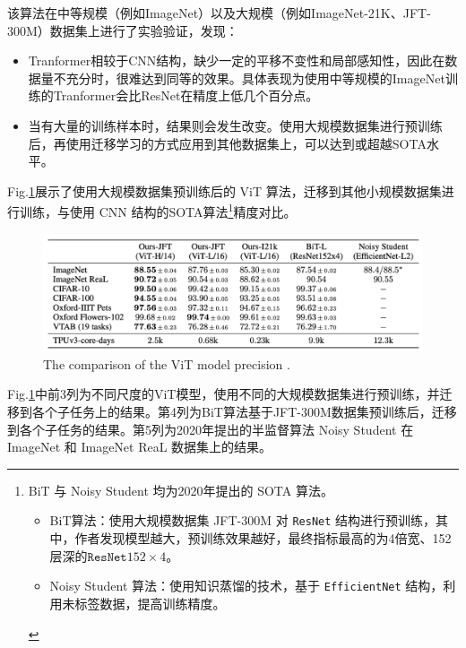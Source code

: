 \documentclass[letterpaper,10pt]{article}
\begin{document}
	
	该算法在中等规模（例如ImageNet）以及大规模（例如ImageNet-21K、JFT-300M）数据集上进行了实验验证，发现：
	
	\begin{itemize}
		\item {}
			Tranformer相较于CNN结构，缺少一定的平移不变性和局部感知性，因此在数据量不充分时，很难达到同等的效果。具体表现为使用中等规模的ImageNet训练的Tranformer会比ResNet在精度上低几个百分点。
		\item {}
			当有大量的训练样本时，结果则会发生改变。使用大规模数据集进行预训练后，再使用迁移学习的方式应用到其他数据集上，可以达到或超越SOTA水平。
	\end{itemize}
	
	Fig.\ref{fig: ViT precision}展示了使用大规模数据集预训练后的 ViT 算法，迁移到其他小规模数据集进行训练，与使用 CNN 结构的SOTA算法\footnote{BiT 与 Noisy Student 均为2020年提出的 SOTA 算法。
		\begin{itemize}
			\item {}
				BiT算法\cite{kolesnikov2020big}：使用大规模数据集 JFT-300M 对 \texttt{ResNet} 结构进行预训练，其中，作者发现模型越大，预训练效果越好，最终指标最高的为4倍宽、152层深的$\texttt{ResNet}152\times 4$。
			\item {}
				Noisy Student 算法\cite{xie2020self}：使用知识蒸馏的技术，基于 \texttt{EfficientNet} 结构，利用未标签数据，提高训练精度。
		\end{itemize}	
	}精度对比。
	
	
	\begin{figure}[htbp]
		\centering 
		\includegraphics[width=0.8\columnwidth]{picture/The ViT model precision}
		\caption{
			\label{fig: ViT precision} The comparison of the ViT model precision .
		}
	\end{figure}
	
	
	Fig.\ref{fig: ViT precision}中前3列为不同尺度的ViT模型，使用不同的大规模数据集进行预训练，并迁移到各个子任务上的结果。第4列为BiT算法基于JFT-300M数据集预训练后，迁移到各个子任务的结果。第5列为2020年提出的半监督算法 Noisy Student 在 ImageNet 和 ImageNet ReaL 数据集上的结果。
	
\end{document}
